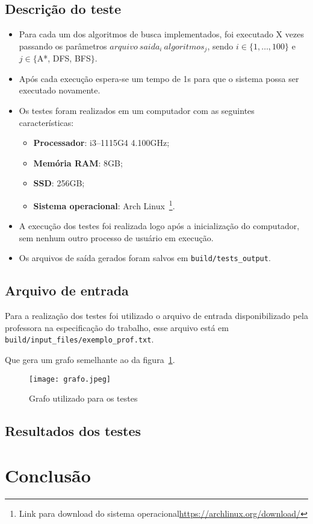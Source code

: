 \documentclass[12pt, a4paper]{article}
\begin{document}
\subsection{Descrição do teste}
\begin{itemize}
    \item Para cada um dos algoritmos de busca implementados,
    foi executado X vezes passando os parâmetros \( arquivo ~ saida_i ~ algoritmos_j \),
    sendo \( i \in \{1, \ldots, 100\} \) e \( j \in \{ \)A*, DFS, BFS\( \} \).
    \item Após cada execução espera-se um tempo de 1s para que o sistema possa ser executado novamente.
    \item Os testes foram realizados em um computador com as seguintes características:
    \begin{itemize}
        \item\textbf{Processador}: i3--1115G4 4.100GHz;
        \item\textbf{Memória RAM}: 8GB\@;
        \item\textbf{SSD}: 256GB\@;
        \item\textbf{Sistema operacional}: Arch Linux~\footnote{Link para download do sistema operacional\url{https://archlinux.org/download/}}.
    \end{itemize}
    \item A execução dos testes foi realizada logo após a inicialização do computador, sem nenhum outro processo de usuário em execução.
    \item Os arquivos de saída gerados foram salvos em \texttt{build/tests\_output}.
\end{itemize}

\subsection{Arquivo de entrada}\label{sec:arquivo_ent}
Para a realização dos testes foi utilizado o arquivo de entrada disponibilizado pela professora na especificação do trabalho,
esse arquivo está em \texttt{build/input\_files/exemplo\_prof.txt}.

Que gera um grafo semelhante ao da figura~\ref{fig:grafo}.
\begin{figure}[!h]
    \centering
    \texttt{[image: grafo.jpeg]}
    \caption{Grafo utilizado para os testes}
    \label{fig:grafo}
\end{figure}

\subsection{Resultados dos testes}\label{sec:res}


\section{Conclusão}\label{sec:concl}

%
\end{document}
